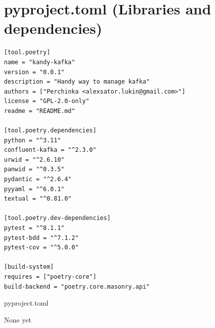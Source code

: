 \documentclass[10pt , a4paper]{report}
\begin{document}
\section{pyproject.toml (Libraries and dependencies)}\label{appendix:libs}
\begin{listing}[htbp]
    \begin{verbatim}
[tool.poetry]
name = "kandy-kafka"
version = "0.0.1"
description = "Handy way to manage kafka"
authors = ["Perchinka <alexsator.lukin@gmail.com>"]
license = "GPL-2.0-only"
readme = "README.md"

[tool.poetry.dependencies]
python = "^3.11"
confluent-kafka = "^2.3.0"
urwid = "^2.6.10"
panwid = "^0.3.5"
pydantic = "^2.6.4"
pyyaml = "^6.0.1"
textual = "^0.81.0"

[tool.poetry.dev-dependencies]
pytest = "^8.1.1"
pytest-bdd = "^7.1.2"
pytest-cov = "^5.0.0"

[build-system]
requires = ["poetry-core"]
build-backend = "poetry.core.masonry.api"
    \end{verbatim}
    \caption{pyproject.toml}
\end{listing}

\renewcommand{\bibname}{References}
\begin{thebibliography}{00}
 None yet
\end{thebibliography}
\end{document}
